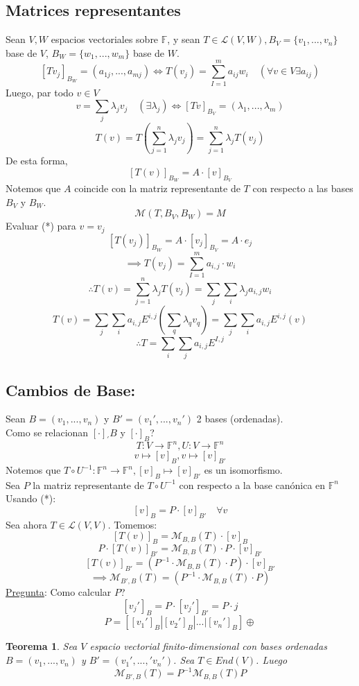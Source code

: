 \documentclass[11pt]{book}
\newtheorem{thm}{Teorema}[section]
\theoremstyle{definition}
\begin{document}
\subsection{Matrices representantes}
Sean $V,W$ espacios vectoriales sobre $\mathbb{F}$, y sean $T\in\mathcal{L}(V,W),B_V=\{v_1,...,v_n\}$ base de $V$, $B_W=\{w_1,...,w_m\}$ base de $W$.
\[ [Tv_j]_{B_W}=(a_{1j},...,a_{mj})\iff T(v_j)=\sum^m_{I=1}a_{ij}w_i\quad (\forall v\in V \exists a_{ij})\]
Luego, par todo $v\in V$
\[v=\sum_j\lambda_jv_j\quad(\exists \lambda_j)\iff [Tv]_{B_V}=(\lambda_{1},...,\lambda_{m})\]
\[T(v)=T\left(\sum^n_{j=1}\lambda_j v_j\right)=\sum^n_{j=1}\lambda_jT(v_j)\]
De esta forma,
\[ [T(v)]_{B_W}=A\cdot [v]_{B_V}\]
Notemos que $A$ coincide con la matriz representante de $T$ con respecto a las bases $B_V$ y $B_W$.
\[\mathcal{M}(T,B_V,B_W)=M\]
Evaluar (*) para $v=v_j$
\[[T(v_j)]_{B_W}=A\cdot[v_j]_{B_V}=A\cdot e_j\]
\[\implies T(v_j)=\sum^m_{I=1}a_{i,j}\cdot w_i\]
\[\therefore T(v)=\sum^n_{j=1}\lambda_jT(v_j)=\sum_j\sum_i\lambda_ja_{i,j}w_i\]
\[T(v)=\sum_j\sum_ia_{i,j}E^{i,j}(\sum_q\lambda_qv_q)=\sum_j\sum_ia_{i,j}E^{i,j}(v)\]
\[\therefore T=\sum_i\sum_ja_{i,j}E^{I,j}\]
\subsection{Cambios de Base:}
Sean $B=(v_1,...,v_n)$ y $B'=(v_1',...,v_n')$ 2 bases (ordenadas).\\
Como se relacionan $[\cdot ]_{'}B$ y $[\cdot ]_{B}$?
\[ T:V\rightarrow\mathbb{F}^n,U:V\rightarrow\mathbb{F}^n\]
\[v\mapsto [v]_B,v\mapsto [v]_{B'}\]
Notemos que $T\circ U^{-1}:\mathbb{F}^n\rightarrow\mathbb{F}^n,[v]_B\mapsto [v]_{B'}$ es un isomorfismo.\\
Sea $P$ la matriz representante de $T\circ U^{-1}$ con respecto a la base canónica en $\mathbb{F}^n$\\
Usando (*):
\[ [v]_B=P\cdot [v]_{B'}\quad \forall v\]
Sea ahora $T\in\mathcal{L}(V,V)$. Tomemos:
\[[T(v)]_B=\mathcal{M}_{B,B}(T)\cdot [v]_B\]
\[ P\cdot [T(v)]_{B'}=\mathcal{M}_{B,B}(T)\cdot P\cdot [v]_{B'}\]
\[[T(v)]_{B'}=\left(P^{-1}\cdot\mathcal{M}_{B,B}(T)\cdot P\right)\cdot [v]_{B'}\]
\[\implies \mathcal{M}_{B',B}(T)=\left(P^{-1}\cdot\mathcal{M}_{B,B}(T)\cdot P\right)\]
\underline{Pregunta}: Como calcular $P$?
\[ [v_j']_B=P\cdot [v_j']_{B'}=P\cdot j\]
\[ P=\left[ [v_1']_B| [v_2']_B|...|[v_n']_B\right]\oplus\]
\begin{thm}
Sea $V$ espacio vectorial finito-dimensional con bases ordenadas $B=(v_1,...,v_n)$ y $B'=(v_1',...,'v_n')$. Sea $T\in End(V)$. Luego
\[\mathcal{M}_{B',B}(T)=P^{-1}\mathcal{M}_{B,B}(T)P\]
\end{thm}
\end{document}
